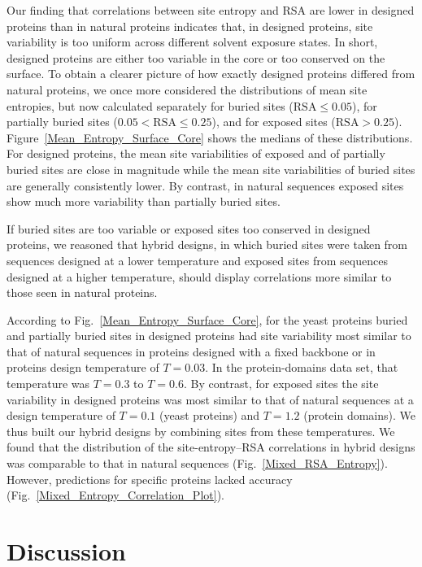 \documentclass[12pt]{article}
\begin{document}
Our finding that correlations between site entropy and RSA are lower in designed proteins than in natural proteins indicates that, in designed proteins, site variability is too uniform across different solvent exposure states. In short, designed proteins are either too variable in the core or too conserved on the surface. To obtain a clearer picture of how exactly designed proteins differed from natural proteins, we once more considered the distributions of mean site entropies, but now calculated separately for buried sites ($\text{RSA}\leq0.05$), for partially buried sites ($0.05<\text{RSA}\leq0.25$), and for exposed sites ($\text{RSA}>0.25$). Figure~\ref{Mean_Entropy_Surface_Core} shows the medians of these distributions. For designed proteins, the mean site variabilities of exposed and of partially buried sites are close in magnitude while the mean site variabilities of buried sites are generally consistently lower. By contrast, in natural sequences exposed sites show much more variability than partially buried sites.

If buried sites are too variable or exposed sites too conserved in designed proteins, we reasoned that hybrid designs, in which buried sites were taken from sequences designed at a lower temperature and exposed sites from sequences designed at a higher temperature, should display correlations more similar to those seen in natural proteins. 

According to Fig.~\ref{Mean_Entropy_Surface_Core}, for the yeast proteins buried and partially buried sites in designed proteins had site variability most similar to that of natural sequences in proteins designed with a fixed backbone or in proteins design temperature of $T=0.03$. In the protein-domains data set, that temperature was $T=0.3$ to $T = 0.6$.  By contrast, for exposed sites the site variability in designed proteins was most similar to that of natural sequences at a design temperature of $T= 0.1$ (yeast proteins) and $T  = 1.2$ (protein domains).  We thus built our hybrid designs by combining sites from these temperatures. We found that the distribution of the site-entropy--RSA correlations in hybrid designs was comparable to that in natural sequences (Fig.~\ref{Mixed_RSA_Entropy}). However, predictions for specific proteins lacked accuracy (Fig.~\ref{Mixed_Entropy_Correlation_Plot}).


\section{Discussion}
\end{document}
